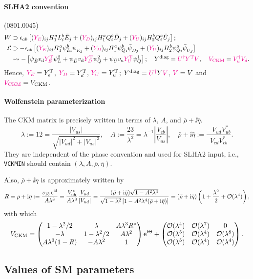 \documentclass[CheatSheet]{subfiles}
\begin{document}
\paragraph{SLHA2 convention} (0801.0045)
\begin{align}
 W &\supset \epsilon_{ab}\left[
({\color{magenta}Y_E})_{ij}H_1^a L_i^b \bar E_j
+({\color{magenta}Y_D})_{ij}H_1^a Q_i^b \bar D_j
+({\color{magenta}Y_U})_{ij}H_2^b Q_i^a \bar U_j
\right];
\\
\mathcal L&\supset
- \epsilon_{ab}\left[
({\color{magenta}Y_E})_{ij}H_1^a \psi_{Li}^b \psi_{\bar Ej}
+({\color{magenta}Y_D})_{ij}H_1^a \psi_{Qi}^b \bar \psi_{\bar Dj}
+({\color{magenta}Y_U})_{ij}H_2^b \psi_{Qi}^a \bar \psi_{\bar Uj}
\right]
\\&\leadsto
- \left[
\psi_{\bar E}v_{\mathrm{d}} {\color{magenta}Y_E^{\mathrm{T}}}\psi_L^2
+\psi_{\bar D}v_{\mathrm{d}}{\color{magenta}Y_D^{\mathrm{T}}}\psi_Q^2
+\psi_{\bar U}v_{\mathrm{u}}{\color{magenta}Y_U^{\mathrm{T}}}\psi_Q^1
\right];
\quad
Y^{\mathrm{diag}} = {\color{magenta}U^\dagger Y^{\mathrm{T}} V},
\quad
{\color{magenta}V_{\mathrm{CKM}}} = {\color{magenta}V_u^\dagger V_d}.
\end{align}
Hence, ${\color{magenta}Y_E}=Y_{e}^{\mathrm{T}}$, ${\color{magenta}Y_D}=Y_{d}^{\mathrm{T}}$, ${\color{magenta}Y_U}=Y_{u}^{\mathrm{T}}$;
$Y^{\mathrm{diag}}={\color{magenta}U^\dagger}Y{\color{magenta}V}$, ${\color{magenta}V}=V$ and ${\color{magenta}V_{\mathrm{CKM}}}=V_{\mathrm{CKM}}$.

\paragraph{Wolfenstein parameterization}
The CKM matrix is precisely written in terms of $\lambda$, $A$, and $\bar\rho+\ii\bar\eta$.
\begin{equation}
  \lambda := \si{12} = \frac{|V_{us}|}{\sqrt{|V_{ud}|^2+|V_{us}|^2}},
\quad
  A:=\frac{\si{23}}{\lambda^2}=\lambda^{-1}\left|\frac{V_{cb}}{V_{us}}\right|,
\quad
\bar\rho+\ii\bar\eta:=\frac{-V_{ud}V^*_{ub}}{V_{cd}V^*_{cb}}.
\end{equation}
They are independent of the phase convention and used for SLHA2 input, i.e., \texttt{VCKMIN} should contain $(\lambda, A, \bar\rho, \bar\eta)$.

Also, $\bar\rho+\ii\eta$ is approximately written by
\begin{equation}
 R=\rho+\mathrm{i}\eta:=\frac{s_{13}\mathop{}\!\mathrm{e}^{\mathrm{i}\delta}}{A\lambda^3}
=\frac{V^*_{ub}}{A\lambda^3}\frac{V_{ud}}{|V_{ud}|}
= \frac{(\bar\rho+\mathrm{i}\bar\eta)\sqrt{1-A^2\lambda^4}}
        {\sqrt{1-\lambda^2}\left[1-A^2\lambda^4(\bar\rho+\mathrm{i}\bar\eta)\right]}
= \left(\bar\rho+\mathrm{i}\bar\eta\right)\left(1+\frac{\lambda^2}{2}+\operatorname{\mathcal{O}}(\lambda^4)\right),
\end{equation}
with which
\begin{equation}
 V_{\mathrm{CKM}}
=\begin{pmatrix}
 1-\lambda^2/2 & \lambda       & A\lambda^3R^*\\
 -\lambda      & 1-\lambda^2/2 & A\lambda^2\\
 A\lambda^3(1-R) & -A\lambda^2 & 1
\end{pmatrix}\mathop{}\!\mathrm{e}^{\mathrm{i}\Theta}
+\begin{pmatrix}
\operatorname{\mathcal{O}}(\lambda^4) & \operatorname{\mathcal{O}}(\lambda^7) & 0\\
\operatorname{\mathcal{O}}(\lambda^5) & \operatorname{\mathcal{O}}(\lambda^4) & \operatorname{\mathcal{O}}(\lambda^8)\\
\operatorname{\mathcal{O}}(\lambda^5) & \operatorname{\mathcal{O}}(\lambda^4) & \operatorname{\mathcal{O}}(\lambda^4)
\end{pmatrix}.
\end{equation}

\subsection{Values of SM parameters}
\end{document}
